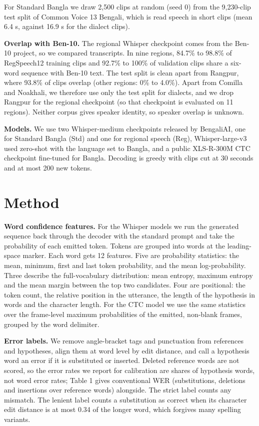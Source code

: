 \documentclass[10pt]{article}
\begin{document}
For Standard Bangla we draw 2,500 clips at random (seed 0) from the 9,230-clip test split of Common Voice 13 Bengali, which is read speech in short clips (mean 6.4 s, against 16.9 s for the dialect clips).


\textbf{Overlap with Ben-10.} The regional Whisper checkpoint comes from the Ben-10 project, so we compared transcripts. In nine regions, 84.7\% to 98.8\% of RegSpeech12 training clips and 92.7\% to 100\% of validation clips share a six-word sequence with Ben-10 text. The test split is clean apart from Rangpur, where 93.8\% of clips overlap (other regions: 0\% to 4.0\%). Apart from Comilla and Noakhali, we therefore use only the test split for dialects, and we drop Rangpur for the regional checkpoint (so that checkpoint is evaluated on 11 regions). Neither corpus gives speaker identity, so speaker overlap is unknown.


\textbf{Models.} We use two Whisper-medium checkpoints released by BengaliAI, one for Standard Bangla (Std) and one for regional speech (Reg), Whisper-large-v3 used zero-shot with the language set to Bangla, and a public XLS-R-300M CTC checkpoint fine-tuned for Bangla. Decoding is greedy with clips cut at 30 seconds and at most 200 new tokens.


\section{Method}

\textbf{Word confidence features.} For the Whisper models we run the generated sequence back through the decoder with the standard prompt and take the probability of each emitted token. Tokens are grouped into words at the leading-space marker. Each word gets 12 features. Five are probability statistics: the mean, minimum, first and last token probability, and the mean log-probability. Three describe the full-vocabulary distribution: mean entropy, maximum entropy and the mean margin between the top two candidates. Four are positional: the token count, the relative position in the utterance, the length of the hypothesis in words and the character length. For the CTC model we use the same statistics over the frame-level maximum probabilities of the emitted, non-blank frames, grouped by the word delimiter.


\textbf{Error labels.} We remove angle-bracket tags and punctuation from references and hypotheses, align them at word level by edit distance, and call a hypothesis word an error if it is substituted or inserted. Deleted reference words are not scored, so the error rates we report for calibration are shares of hypothesis words, not word error rates; Table 1 gives conventional WER (substitutions, deletions and insertions over reference words) alongside. The strict label counts any mismatch. The lenient label counts a substitution as correct when its character edit distance is at most 0.34 of the longer word, which forgives many spelling variants.
\end{document}
